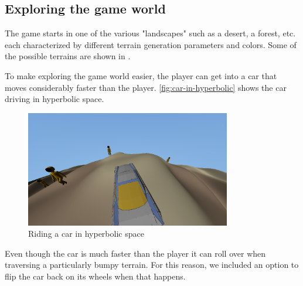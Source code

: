 \subsection{Exploring the game world}
The game starts in one of the various "landscapes" such as a desert, a forest, etc. each characterized by different terrain generation parameters and colors.
Some of the possible terrains are shown in .

To make exploring the game world easier, the player can get into a car that moves considerably faster than the player.
\autoref{fig:car-in-hyperbolic} shows the car driving in hyperbolic space.
\begin{figure}[!htb]
    \centering
    \includegraphics[width=0.8\textwidth]{chapters/results/sections/gameplay/resources/car-in-hyperbolic.png}
    \caption{Riding a car in hyperbolic space}
    \label{fig:car-in-hyperbolic}
\end{figure}
Even though the car is much faster than the player it can roll over when traversing a particularly bumpy terrain.
For this reason, we included an option to flip the car back on its wheels when that happens.